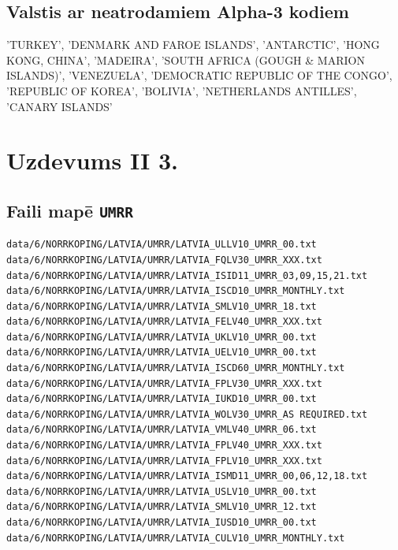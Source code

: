 \documentclass[12pt,a4paper]{article}
\begin{document}
\subsection*{Valstis ar neatrodamiem Alpha-3 kodiem}
'TURKEY', 'DENMARK AND FAROE ISLANDS', 'ANTARCTIC', 'HONG KONG, CHINA', 'MADEIRA', 'SOUTH AFRICA (GOUGH \& MARION ISLANDS)', 'VENEZUELA', 'DEMOCRATIC REPUBLIC OF THE CONGO', 'REPUBLIC OF KOREA', 'BOLIVIA', 'NETHERLANDS ANTILLES', 'CANARY ISLANDS'

\section{Uzdevums II 3.}\label{ap:II 3}
\subsection*{Faili mapē \texttt{UMRR}}
\begin{lstlisting}[breaklines]
data/6/NORRKOPING/LATVIA/UMRR/LATVIA_ULLV10_UMRR_00.txt
data/6/NORRKOPING/LATVIA/UMRR/LATVIA_FQLV30_UMRR_XXX.txt
data/6/NORRKOPING/LATVIA/UMRR/LATVIA_ISID11_UMRR_03,09,15,21.txt
data/6/NORRKOPING/LATVIA/UMRR/LATVIA_ISCD10_UMRR_MONTHLY.txt
data/6/NORRKOPING/LATVIA/UMRR/LATVIA_SMLV10_UMRR_18.txt
data/6/NORRKOPING/LATVIA/UMRR/LATVIA_FELV40_UMRR_XXX.txt
data/6/NORRKOPING/LATVIA/UMRR/LATVIA_UKLV10_UMRR_00.txt
data/6/NORRKOPING/LATVIA/UMRR/LATVIA_UELV10_UMRR_00.txt
data/6/NORRKOPING/LATVIA/UMRR/LATVIA_ISCD60_UMRR_MONTHLY.txt
data/6/NORRKOPING/LATVIA/UMRR/LATVIA_FPLV30_UMRR_XXX.txt
data/6/NORRKOPING/LATVIA/UMRR/LATVIA_IUKD10_UMRR_00.txt
data/6/NORRKOPING/LATVIA/UMRR/LATVIA_WOLV30_UMRR_AS REQUIRED.txt
data/6/NORRKOPING/LATVIA/UMRR/LATVIA_VMLV40_UMRR_06.txt
data/6/NORRKOPING/LATVIA/UMRR/LATVIA_FPLV40_UMRR_XXX.txt
data/6/NORRKOPING/LATVIA/UMRR/LATVIA_FPLV10_UMRR_XXX.txt
data/6/NORRKOPING/LATVIA/UMRR/LATVIA_ISMD11_UMRR_00,06,12,18.txt
data/6/NORRKOPING/LATVIA/UMRR/LATVIA_USLV10_UMRR_00.txt
data/6/NORRKOPING/LATVIA/UMRR/LATVIA_SMLV10_UMRR_12.txt
data/6/NORRKOPING/LATVIA/UMRR/LATVIA_IUSD10_UMRR_00.txt
data/6/NORRKOPING/LATVIA/UMRR/LATVIA_CULV10_UMRR_MONTHLY.txt
\end{lstlisting}
\end{document}
